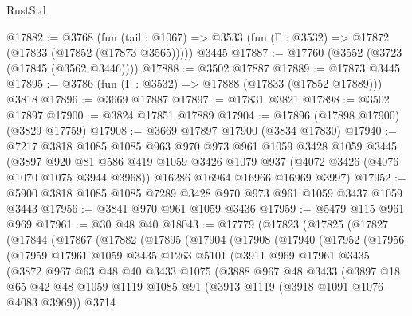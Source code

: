 \begin{lexlean}{RustStd}
\begin{coremodule}
@17882 := @3768
    (fun (tail : @1067) => @3533 (fun (Γ : @3532) => @17872 (@17833 (@17852 (@17873 @3565)))))
    @3445
@17887 := @17760 (@3552 (@3723 (@17845 (@3562 @3446))))
@17888 := @3502 @17887
@17889 := @17873 @3445
@17895 := @3786 (fun (Γ : @3532) => @17888 (@17833 (@17852 @17889))) @3818
@17896 := @3669 @17887
@17897 := @17831 @3821
@17898 := @3502 @17897
@17900 := @3824 @17851 @17889
@17904 := @17896 (@17898 @17900) (@3829 @17759)
@17908 := @3669 @17897 @17900 (@3834 @17830)
@17940 := @7217
    @3818
    @1085
    @1085
    @963
    @970
    @973
    @961
    @1059
    @3428
    @1059
    @3445
    (@3897
      @920
      @81
      @586
      @419
      @1059
      @3426
      @1079
      @937
      (@4072 @3426 (@4076 @1070 @1075 @3944 @3968))
      @16286
      @16964
      @16966
      @16969
      @3997)
@17952 := @5900 @3818 @1085 @1085 @7289 @3428 @970 @973 @961 @1059 @3437 @1059 @3443
@17956 := @3841 @970 @961 @1059 @3436
@17959 := @5479 @115 @961 @969
@17961 := @30 @48 @40
@18043 := @17779
    (@17823
      (@17825
        (@17827
          (@17844
            (@17867
              (@17882
                (@17895
                  (@17904
                    (@17908
                      (@17940
                        (@17952
                          (@17956
                            (@17959
                              @17961
                              @1059
                              @3435
                              @1263
                              @5101
                              (@3911
                                @969
                                @17961
                                @3435
                                (@3872
                                  @967
                                  @63
                                  @48
                                  @40
                                  @3433
                                  @1075
                                  (@3888
                                    @967
                                    @48
                                    @3433
                                    (@3897
                                      @18
                                      @65
                                      @42
                                      @48
                                      @1059
                                      @1119
                                      @1085
                                      @91
                                      (@3913 @1119 (@3918 @1091 @1076 @4083 @3969))
                                      @3714

\end{coremodule}
\end{lexlean}
